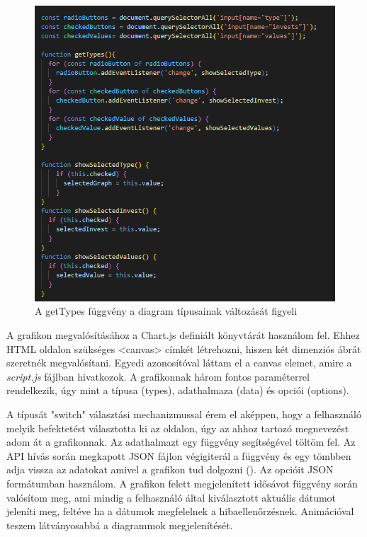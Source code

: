 \begin{figure}[h]
\centering
\includegraphics[scale=0.6]{images/types.png}
\caption{A getTypes függvény a diagram típusainak változását figyeli}
\label{fig:fetch}
\end{figure}

\pagebreak

A grafikon megvalósításához a Chart.js definiált könyvtárát használom fel. Ehhez HTML oldalon szükséges <canvas> címkét létrehozni, hiszen két dimenziós ábrát szeretnék megvalósítani. Egyedi azonosítóval láttam el a canvas elemet, amire a \emph{script.js} fájlban hivatkozok. A grafikonnak három fontos paraméterrel rendelkezik, úgy mint a típusa (types), adathalmaza (data) és opciói (options).

	A típusát "switch" választási mechanizmussal érem el aképpen, hogy a felhasználó melyik befektetést választotta ki az oldalon, úgy az ahhoz tartozó megnevezést adom át a grafikonnak. 
Az adathalmazt egy függvény segítségével töltöm fel. Az API hívás során megkapott JSON fájlon végigiterál a függvény és egy tömbben adja vissza az adatokat amivel a grafikon tud dolgozni (). Az opcióit JSON formátumban használom. A grafikon felett megjelenített idősávot függvény során valósítom meg, ami mindig a felhasználó által kiválasztott aktuális dátumot jeleníti meg, feltéve ha a dátumok megfelelnek a hibaellenőrzésnek. Animációval teszem látványosabbá a diagrammok megjelenítését.

